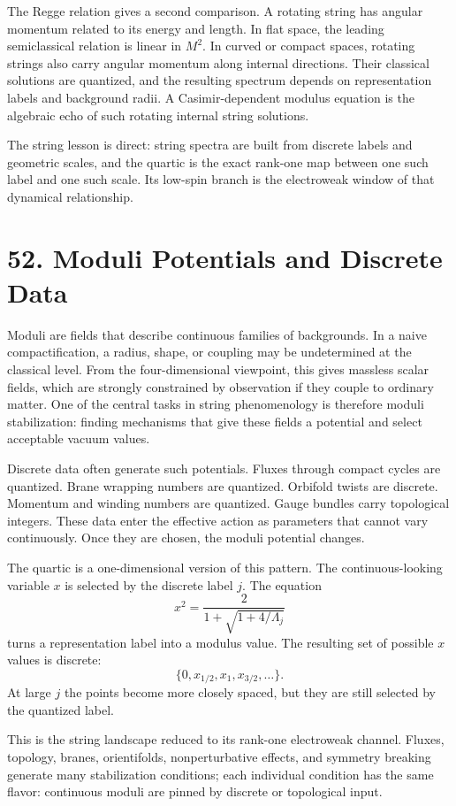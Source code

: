 \documentclass[11pt]{article}
\newcommand{\Lspin}{\Lambda_j}
\begin{document}
The Regge relation gives a second comparison. A rotating string has angular momentum related to its energy and length. In flat space, the leading semiclassical relation is linear in \(M^2\). In curved or compact spaces, rotating strings also carry angular momentum along internal directions. Their classical solutions are quantized, and the resulting spectrum depends on representation labels and background radii. A Casimir-dependent modulus equation is the algebraic echo of such rotating internal string solutions.

The string lesson is direct: string spectra are built from discrete labels and geometric scales, and the quartic is the exact rank-one map between one such label and one such scale. Its low-spin branch is the electroweak window of that dynamical relationship.

\section*{52. Moduli Potentials and Discrete Data}

Moduli are fields that describe continuous families of backgrounds. In a naive compactification, a radius, shape, or coupling may be undetermined at the classical level. From the four-dimensional viewpoint, this gives massless scalar fields, which are strongly constrained by observation if they couple to ordinary matter. One of the central tasks in string phenomenology is therefore moduli stabilization: finding mechanisms that give these fields a potential and select acceptable vacuum values.

Discrete data often generate such potentials. Fluxes through compact cycles are quantized. Brane wrapping numbers are quantized. Orbifold twists are discrete. Momentum and winding numbers are quantized. Gauge bundles carry topological integers. These data enter the effective action as parameters that cannot vary continuously. Once they are chosen, the moduli potential changes.

The quartic is a one-dimensional version of this pattern. The continuous-looking variable \(x\) is selected by the discrete label \(j\). The equation
\[
        x^2=\frac{2}{1+\sqrt{1+4/\Lspin}}
\]
turns a representation label into a modulus value. The resulting set of possible \(x\) values is discrete:
\[
        \{0,x_{1/2},x_1,x_{3/2},\ldots\}.
\]
At large \(j\) the points become more closely spaced, but they are still selected by the quantized label.

This is the string landscape reduced to its rank-one electroweak channel. Fluxes, topology, branes, orientifolds, nonperturbative effects, and symmetry breaking generate many stabilization conditions; each individual condition has the same flavor: continuous moduli are pinned by discrete or topological input.
\end{document}
